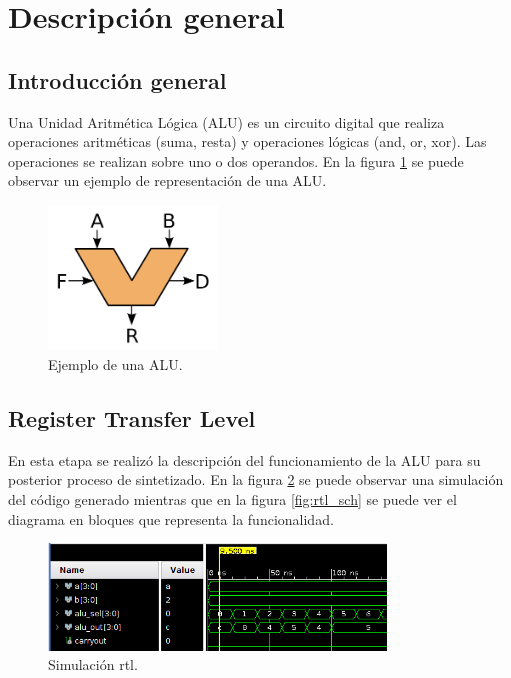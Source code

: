 \documentclass[
    11pt,
    spanish,
	a4paper
]{article}
\begin{document}
\section{Descripción general}
\label{sec:descripcion}

\subsection{Introducción general}
\label{subsec:teorica}

Una Unidad Aritmética Lógica (ALU) es un circuito digital que realiza operaciones aritméticas (suma, resta) y operaciones lógicas (and, or, xor).
Las operaciones se realizan sobre uno o dos operandos.
En la figura \ref{fig:ejemplo} se puede observar un ejemplo de representación de una ALU.

\begin{figure}[h!]
    \centering
    \includegraphics[width=0.4\textwidth]{img/alu_example.png}
    \caption{Ejemplo de una ALU.}
    \label{fig:ejemplo}
\end{figure}

\subsection{Register Transfer Level}
\label{subsec:rtl}

En esta etapa se realizó la descripción del funcionamiento de la ALU para su posterior proceso de sintetizado.
En la figura \ref{fig:rtl_sim} se puede observar una simulación del código generado mientras que en la figura \ref{fig:rtl_sch} se puede ver el diagrama en bloques que representa la funcionalidad.

\begin{figure}[h!]
    \centering
    \includegraphics[width=0.8\textwidth]{img/rtl_sim.png}
    \caption{Simulación rtl.}
    \label{fig:rtl_sim}
\end{figure}
\end{document}
